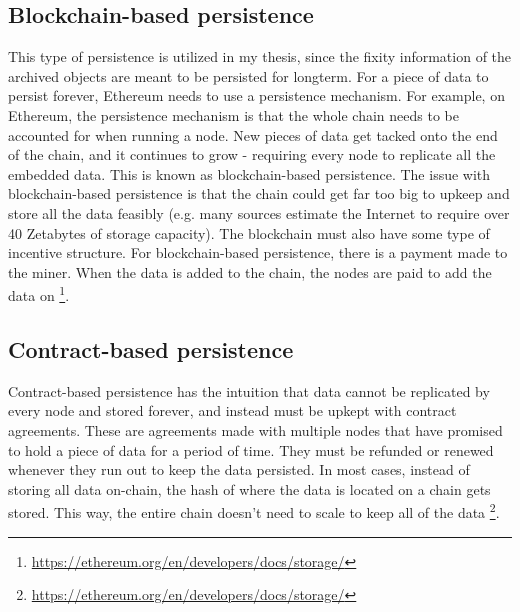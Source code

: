 \subsection{Blockchain-based persistence}
This type of persistence is utilized in my thesis, since the fixity information of the archived objects are meant to be persisted for longterm.
For a piece of data to persist forever, Ethereum needs to use a persistence mechanism. For example, on Ethereum, the persistence mechanism is that the whole chain needs to be accounted for when running a node. New pieces of data get tacked onto the end of the chain, and it continues to grow - requiring every node to replicate all the embedded data. This is known as blockchain-based persistence. The issue with blockchain-based persistence is that the chain could get far too big to upkeep and store all the data feasibly (e.g. many sources estimate the Internet to require over 40 Zetabytes of storage capacity). The blockchain must also have some type of incentive structure. For blockchain-based persistence, there is a payment made to the miner. When the data is added to the chain, the nodes are paid to add the data on \footnote{\url{https://ethereum.org/en/developers/docs/storage/}}.
\subsection{Contract-based persistence}
Contract-based persistence has the intuition that data cannot be replicated by every node and stored forever, and instead must be upkept with contract agreements. These are agreements made with multiple nodes that have promised to hold a piece of data for a period of time. They must be refunded or renewed whenever they run out to keep the data persisted. In most cases, instead of storing all data on-chain, the hash of where the data is located on a chain gets stored. This way, the entire chain doesn't need to scale to keep all of the data \footnote{\url{https://ethereum.org/en/developers/docs/storage/}}.
